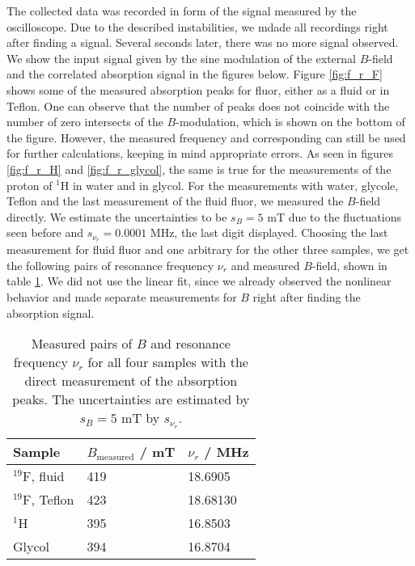The collected data was recorded in form of the signal measured by the oscilloscope. 
Due to the described instabilities, we mdade all recordings right after finding a signal. 
Several seconds later, there was no more signal observed.
We show the input signal given by the sine modulation of the external $B$-field and 
the correlated absorption signal in the figures below. Figure \ref{fig:f_r_F} shows 
some of the measured absorption peaks for fluor, either as a fluid or in Teflon. 
One can observe that the number of peaks does not coincide with the number of zero 
intersects of the $B$-modulation, which is shown on the bottom of the figure. 
However, the measured frequency and corresponding can still be used for further calculations, 
keeping in mind appropriate errors. 
As seen in figures \ref{fig:f_r_H} and \ref{fig:f_r_glycol}, the same is true for 
the measurements of the proton of $^1$H in water and in glycol. For the measurements with 
water, glycole, Teflon and the last measurement of the fluid fluor, we measured the $B$-field 
directly. We estimate the uncertainties to be $s_B = 5$ mT due to the fluctuations seen before and 
$s_{\nu_r} = 0.0001$ MHz, the last digit displayed. 
Choosing the last measurement for fluid fluor and one arbitrary for the other three samples, we get the 
following pairs of resonance frequency $\nu_r$ and measured 
$B$-field, shown in table \ref{tab:f_r}. 
We did not use the linear fit, since we already observed the nonlinear behavior and 
made separate measurements for $B$ right after finding the absorption signal. 
\renewcommand{\arraystretch}{1.5}
\begin{table}[htdp]
\centering
\begin{tabular}{|p{6.18cm}|p{3.82cm}|p{3.82cm}|}
        \hline
        \rowcolor{LightCyan}
        Sample & $B_\mathrm{measured}$ / mT & $\nu_r$ / MHz\\ \hline
        $^{19}$F, fluid & 419 & 18.6905\\
        $^{19}$F, Teflon & 423 & 18.68130\\
        $^1$H   & 395 & 16.8503 \\
        Glycol  & 394 & 16.8704 \\
        \hline
    \end{tabular}
    \caption{
        Measured pairs of $B$ and resonance frequency $\nu_r$ for all four samples with the direct measurement 
        of the absorption peaks. The uncertainties are estimated by $s_B = 5$ mT by $s_{\nu_r}$. 
        }
    \label{tab:f_r}
\end{table}

\FloatBarrier


